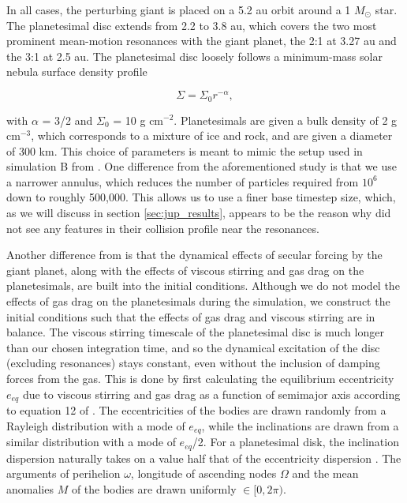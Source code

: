 In all cases, the perturbing giant is placed on a 5.2 au orbit around a 1 $M_{\odot}$ star. The 
planetesimal disc extends from 2.2 to 3.8 au, which covers the two most prominent mean-motion resonances with the giant 
planet, the 2:1 at 3.27 au and the 3:1 at 2.5 au. The planetesimal disc loosely follows a minimum-mass solar nebula surface 
density profile \cite{hayashi81}

\begin{equation}\label{eq:surf_den}
	\Sigma = \Sigma_{0} r^{-\alpha},
\end{equation}

\noindent with $\alpha$ = 3/2 and $\Sigma_{0}$ = 10 g cm$^{-2}$. Planetesimals are given a bulk density of 2 g cm$^{-3}$, 
which corresponds to a mixture of ice and rock, and are given a diameter of 300 km. This choice of parameters is meant to 
mimic the setup used in simulation B from \cite{richardson00}. One difference from the aforementioned study is that we use a 
narrower annulus, which reduces the number of particles required from $10^6$ down to roughly 500,000. This allows us to use a 
finer base timestep size, which, as we will discuss in section \ref{sec:jup_results}, appears to be the reason why \cite{richardson00} did not see any features in their collision profile near the resonances.

Another difference from \cite{richardson00} is that the dynamical effects of secular forcing by the giant planet, along with the 
effects of viscous stirring and gas drag on the planetesimals, are built into the initial conditions. Although we do not model the 
effects of gas drag on the planetesimals during the simulation, we construct the initial conditions such that the effects of gas drag 
and viscous stirring are in balance. The viscous stirring timescale of the planetesimal disc is much longer than our chosen 
integration time, and so the dynamical excitation of the disc (excluding resonances) stays constant, even without the inclusion of 
damping forces from the gas. This is done by first calculating the equilibrium eccentricity $e_{eq}$ due to viscous stirring and 
gas drag as a function of semimajor axis according to equation 12 of \cite{kokubo02}. The eccentricities of the bodies are drawn 
randomly from a Rayleigh distribution with a mode of $e_{eq}$, while the inclinations are drawn from a similar distribution with a 
mode of $e_{eq}$/2. For a planetesimal disk, the inclination dispersion naturally takes on a value half that of the eccentricity dispersion \cite{ida93a}. The arguments of perihelion $\omega$, longitude of ascending nodes $\Omega$ and the 
mean anomalies $M$ of the bodies are drawn uniformly $\in [0, 2 \pi)$.

